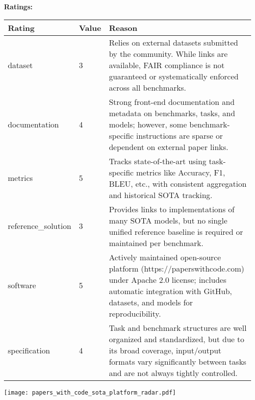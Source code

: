 {{{\bf Ratings:} ~ \\

\begin{tabular}{p{} p{} p{}}
\hline
Rating & Value & Reason \\
\hline
dataset & 3 & Relies on external datasets submitted by the community. While links are available, FAIR compliance
is not guaranteed or systematically enforced across all benchmarks.
 \\
documentation & 4 & Strong front-end documentation and metadata on benchmarks, tasks, and models; however, some benchmark-specific
instructions are sparse or dependent on external paper links.
 \\
metrics & 5 & Tracks state-of-the-art using task-specific metrics like Accuracy, F1, BLEU, etc., with consistent
aggregation and historical SOTA tracking.
 \\
reference\_solution & 3 & Provides links to implementations of many SOTA models, but no single unified reference baseline
is required or maintained per benchmark.
 \\
software & 5 & Actively maintained open-source platform (https://paperswithcode.com) under Apache 2.0 license;
includes automatic integration with GitHub, datasets, and models for reproducibility.
 \\
specification & 4 & Task and benchmark structures are well organized and standardized, but due to its broad coverage,
input/output formats vary significantly between tasks and are not always tightly controlled.
 \\
\hline
\end{tabular}

\texttt{[image: papers\_with\_code\_sota\_platform\_radar.pdf]}
}}
\clearpage